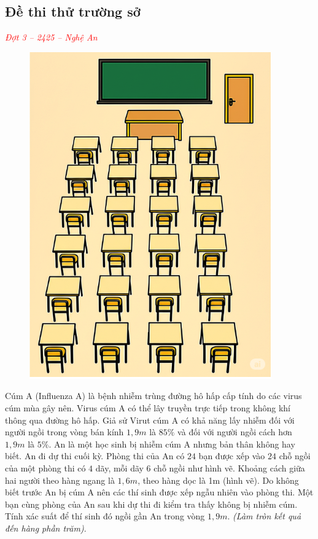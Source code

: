 \documentclass[twoside,final]{hcmut-report}
\newcommand{\exercise}[1]{\begin{exercisebox}#1\end{exercisebox}}
\begin{document}
\subsection{Đề thi thử trường sở}
\exercise{\textcolor{red}{\textit{Đợt 3 -- 2425 -- Nghệ An}}

    \begin{figure}
        \centering
        \includegraphics[width=1.08\linewidth]{images/Nghệ An 2025 - Đợt 3/NgheAn25-2.png}
    \end{figure}
    Cúm A (Influenza A) là bệnh nhiễm trùng đường hô hấp cấp tính do các virus cúm mùa gây nên. Virus cúm A có thể lây truyền trực tiếp trong không khí thông qua đường hô hấp. Giả sử Virut cúm A có khả năng lấy nhiễm đối với người ngồi trong vòng bán kính $1,9m$ là $85\%$ và đối với người ngồi cách hơn $1,9m$ là $5\%$. An là một học sinh bị nhiễm cúm A nhưng bản thân không hay biết. An đi dự thi cuối kỳ. Phòng thi của An có $24$ bạn được xếp vào $24$ chỗ ngồi của một phòng thi có $4$ dãy, mỗi dãy $6$ chỗ ngồi như hình vẽ. Khoảng cách giữa hai người theo hàng ngang là $1,6m$, theo hàng dọc là 1m (hình vẽ). Do không biết trước An bị cúm A nên các thí sinh được xếp ngẫu nhiên vào phòng thi. Một bạn cùng phòng của An sau khi dự thi đi kiểm tra thấy không bị nhiễm cúm. Tính xác suất để thí sinh đó ngồi gần An trong vòng $1,9m$. \textit{(Làm tròn kết quả đến hàng phần trăm)}.
}
\end{document}
